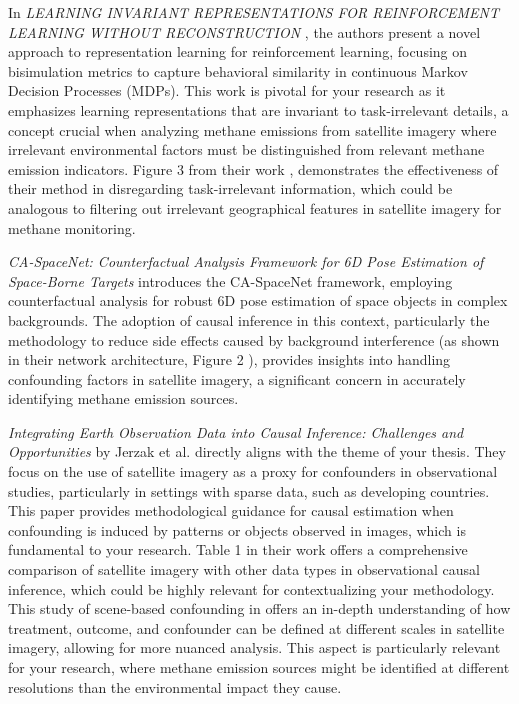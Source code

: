 In \textit{LEARNING INVARIANT REPRESENTATIONS FOR REINFORCEMENT LEARNING WITHOUT RECONSTRUCTION} \cite{zhang_learning_2021}, the authors present a novel approach to representation learning for reinforcement learning, focusing on bisimulation metrics to capture behavioral similarity in continuous Markov Decision Processes (MDPs). This work is pivotal for your research as it emphasizes learning representations that are invariant to task-irrelevant details, a concept crucial when analyzing methane emissions from satellite imagery where irrelevant environmental factors must be distinguished from relevant methane emission indicators. Figure 3 from their work \cite[Figure 3]{zhang_learning_2021}, demonstrates the effectiveness of their method in disregarding task-irrelevant information, which could be analogous to filtering out irrelevant geographical features in satellite imagery for methane monitoring.

\textit{CA-SpaceNet: Counterfactual Analysis Framework for 6D Pose Estimation of Space-Borne Targets} \cite{wang_ca-spacenet_2022} introduces the CA-SpaceNet framework, employing counterfactual analysis for robust 6D pose estimation of space objects in complex backgrounds. The adoption of causal inference in this context, particularly the methodology to reduce side effects caused by background interference (as shown in their network architecture, Figure 2 \cite[Figure 2]{wang_ca-spacenet_2022}), provides insights into handling confounding factors in satellite imagery, a significant concern in accurately identifying methane emission sources.

\textit{Integrating Earth Observation Data into Causal Inference: Challenges and Opportunities} by Jerzak et al. \cite{jerzak_integrating_2023} directly aligns with the theme of your thesis. They focus on the use of satellite imagery as a proxy for confounders in observational studies, particularly in settings with sparse data, such as developing countries. This paper provides methodological guidance for causal estimation when confounding is induced by patterns or objects observed in images, which is fundamental to your research. Table 1 in their work \cite[Table 1]{jerzak_integrating_2023} offers a comprehensive comparison of satellite imagery with other data types in observational causal inference, which could be highly relevant for contextualizing your methodology. This study of scene-based confounding in \cite{jerzak_integrating_2023} offers an in-depth understanding of how treatment, outcome, and confounder can be defined at different scales in satellite imagery, allowing for more nuanced analysis. This aspect is particularly relevant for your research, where methane emission sources might be identified at different resolutions than the environmental impact they cause.

